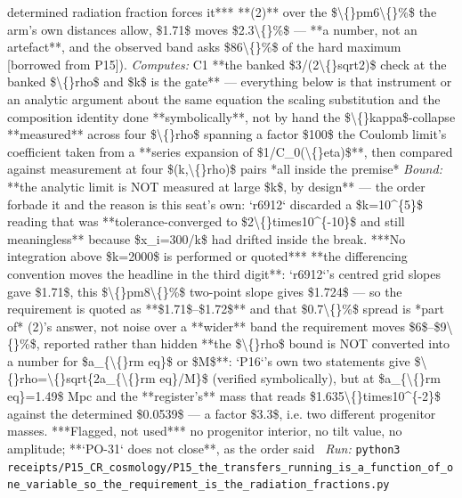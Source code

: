 \begin{description}
determined radiation fraction forces it***  **(2)** over the \$\textbackslash\{\}pm6\textbackslash\{\}\%\$ the arm's own distances allow, \$1.71\$ moves \$2.3\textbackslash\{\}\%\$ --- **a number, not an artefact**, and the observed band asks \$86\textbackslash\{\}\%\$ of the hard maximum [borrowed from P15]). 
\emph{Computes:} C1 **the banked \$3/(2\textbackslash\{\}sqrt2)\$ check at the banked \$\textbackslash\{\}rho\$ and \$k\$ is the gate** --- everything below is that instrument or an analytic argument about the same equation  the scaling substitution and the composition identity done **symbolically**, not by hand  the \$\textbackslash\{\}kappa\$-collapse **measured** across four \$\textbackslash\{\}rho\$ spanning a factor \$100\$  the Coulomb limit's coefficient taken from a **series expansion of \$1/C\_0(\textbackslash\{\}eta)\$**, then compared against measurement at four \$(k,\textbackslash\{\}rho)\$ pairs *all inside the premise*
 \emph{Bound:}  **the analytic limit is NOT measured at large \$k\$, by design** --- the order forbade it and the reason is this seat's own: `r6912` discarded a \$k=10\textasciicircum{}\{5\}\$ reading that was **tolerance-converged to \$2\textbackslash\{\}times10\textasciicircum{}\{-10\}\$ and still meaningless** because \$x\_i=300/k\$ had drifted inside the break. ***No integration above \$k=2000\$ is performed or quoted***  **the differencing convention moves the headline in the third digit**: `r6912`'s centred grid slopes gave \$1.71\$, this \$\textbackslash\{\}pm8\textbackslash\{\}\%\$ two-point slope gives \$1.724\$ --- so the requirement is quoted as **\$1.71\$--\$1.72\$** and that \$0.7\textbackslash\{\}\%\$ spread is *part of* (2)'s answer, not noise  over a **wider** band the requirement moves \$6\$--\$9\textbackslash\{\}\%\$, reported rather than hidden   **the \$\textbackslash\{\}rho\$ bound is NOT converted into a number for \$a\_\{\textbackslash\{\}rm eq\}\$ or \$M\$**: `P16`'s own two statements give \$\textbackslash\{\}rho=\textbackslash\{\}sqrt\{2a\_\{\textbackslash\{\}rm eq\}/M\}\$ (verified symbolically), but at \$a\_\{\textbackslash\{\}rm eq\}=1.49\$ Mpc and the **register's** mass that reads \$1.635\textbackslash\{\}times10\textasciicircum{}\{-2\}\$ against the determined \$0.0539\$ --- a factor \$3.3\$, i.e. two different progenitor masses. ***Flagged, not used***  no progenitor interior, no tilt value, no amplitude; **`PO-31` does not close**, as the order said
\ \emph{Run:} \texttt{python3 receipts/P15\_CR\_cosmology/P15\_the\_transfers\_running\_is\_a\_function\_of\_one\_variable\_so\_the\_requirement\_is\_the\_radiation\_fractions.py}
\end{description}\endgroup
